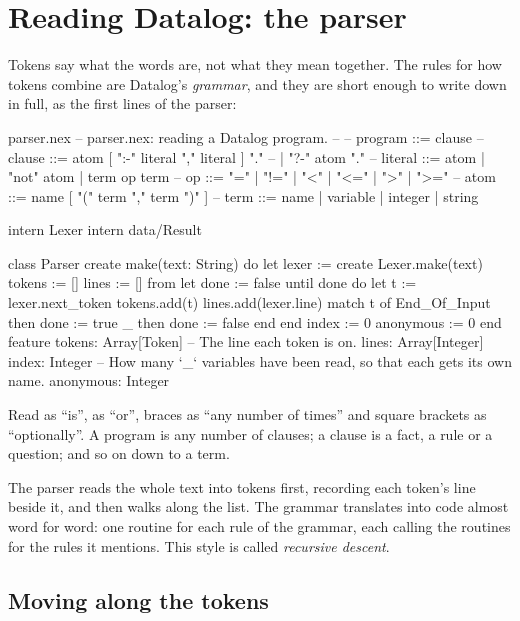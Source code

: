 \chapter{Reading Datalog: the parser}\label{ch:parser}

Tokens say what the words are, not what they mean together. The rules for
how tokens combine are Datalog's \emph{grammar}, and they are short enough
to write down in full, as the first lines of the parser:

\begin{newfile}{parser.nex}
-- parser.nex: reading a Datalog program.
--
--   program  ::= { clause }
--   clause   ::= atom [ ":-" literal { "," literal } ] "."
--              | "?-" atom "."
--   literal  ::= atom | "not" atom | term op term
--   op       ::= "=" | "!=" | "<" | "<=" | ">" | ">="
--   atom     ::= name [ "(" term { "," term } ")" ]
--   term     ::= name | variable | integer | string

intern Lexer
intern data/Result

class Parser
create
  make(text: String)
  do
    let lexer := create Lexer.make(text)
    tokens := []
    lines := []
    from let done := false until done do
      let t := lexer.next_token
      tokens.add(t)
      lines.add(lexer.line)
      match t of
        End_Of_Input then done := true
        _            then done := false
      end
    end
    index := 0
    anonymous := 0
  end
feature
  tokens: Array[Token]
  -- The line each token is on.
  lines: Array[Integer]
  index: Integer
  -- How many `_` variables have been read, so that each gets its own name.
  anonymous: Integer
\end{newfile}

Read \code{::=} as ``is'', \code{|} as ``or'', braces as ``any number of
times'' and square brackets as ``optionally''. A program is any number of
clauses; a clause is a fact, a rule or a question; and so on down to a
term.

The parser reads the whole text into tokens first, recording each token's
line beside it, and then walks along the list. The grammar translates into
code almost word for word: one routine for each rule of the grammar, each
calling the routines for the rules it mentions. This style is called
\emph{recursive descent}.

\section{Moving along the tokens}

